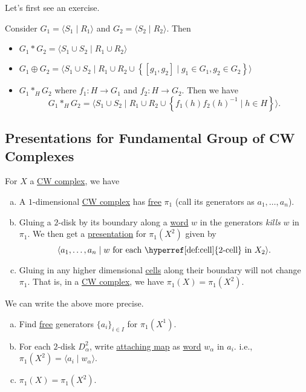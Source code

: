 Let's first see an exercise.
\begin{exercise}
	Consider \(G_1 = \langle S_1 \mid R_1 \rangle \) and \(G_2 = \langle S_2 \mid R_2 \rangle \). Then
	\begin{itemize}
		\item \(G_1\ast G_2 = \langle S_{1}\cup S_2  \mid R_1 \cup R_2 \rangle \)
		\item \(G_1\oplus G_2 = \langle S_1 \cup S_2  \mid R_1 \cup R_2\cup \left\{[g_1, g_2] \mid g_1\in G_1, g_2\in G_2\right\} \rangle \)
		\item \(G_1 \ast_H G_2 \) where \(f_1\colon H\to G_1\) and \(f_2\colon H\to G_2\). Then we have
		      \[
			      G_1\ast_H G_2 = \langle S_1 \cup S_2  \mid R_1 \cup  R_2\cup \left\{f_1(h)f_2(h)^{-1}  \mid h\in H\right\} \rangle.
		      \]
	\end{itemize}
\end{exercise}

\subsection{Presentations for Fundamental Group of CW Complexes}
For \(X\) a \hyperref[def:CW-Complex]{CW complex}, we have
\begin{enumerate}[(a)]
	\item A \(1\)-dimensional \hyperref[def:CW-Complex]{CW complex} has \hyperref[def:free-group]{free} \(\pi _1\) (call its generators as \(a_1, \dots , a_n \)).
	\item Gluing a \(2\)-disk by its boundary along a \hyperref[def:word]{word} \(w\) in the generators \emph{kills} \(w\) in \(\pi _1\). We then get a \hyperref[def:group-presentation]{presentation} for \(\pi _1(X^2)\) given by
	      \[
		      \langle a_1, \dots , a_n \mid w \text{ for each \hyperref[def:cell]{\(2\)-cell} in \(X_2\)}\rangle.
	      \]
	\item Gluing in any higher dimensional \hyperref[def:cell]{cells} along their boundary will not change \(\pi _1\). That is, in a \hyperref[def:CW-Complex]{CW complex}, we have \(\pi _1(X) = \pi _1(X^2)\).
\end{enumerate}

\begin{remark}
	We can write the above more precise.
	\begin{enumerate}[(a)]
		\item Find \hyperref[def:free-group]{free} generators \(\{a _i\}_{i\in I}\) for \(\pi _1(X^1)\).
		\item For each \(2\)-disk \(D^2_\alpha \), write \hyperref[def:attaching-map]{attaching map} as \hyperref[def:word]{word} \(w_\alpha \) in \(a_{i}\). i.e.,
		      \(\pi _1(X^2) = \langle a_{i} \mid w_\alpha  \rangle\).
		\item \(\pi_1(X) = \pi _1(X^2)\).
	\end{enumerate}
\end{remark}

